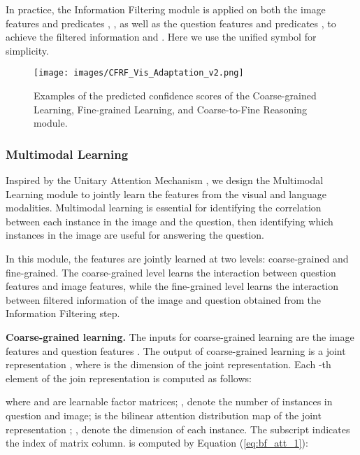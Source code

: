 \documentclass[10pt,twocolumn,letterpaper]{article}
\begin{document}
In practice, the Information Filtering module is applied on both the image features and predicates ,  , as well as the question features and predicates ,   to achieve the filtered information  and . Here we use the unified symbol  for simplicity.



\begin{figure*}[!ht]
    \centering
    \texttt{[image: images/CFRF\_Vis\_Adaptation\_v2.png]}
    \caption{Examples of the predicted confidence scores of the
    Coarse-grained Learning, Fine-grained Learning, and Coarse-to-Fine Reasoning module.}
    \label{fig:sample_Adaptation}
\end{figure*}
\subsubsection{Multimodal Learning}
\label{subsec_multi_integration}

Inspired by the Unitary Attention Mechanism \cite{Kim2018BilinearAN}, we design the Multimodal Learning module to jointly learn the features from the visual and language modalities. Multimodal learning is essential for identifying the correlation between each instance in the image and the question, then identifying which instances in the image are useful for answering the question.







In this module, the features are jointly learned at two levels: coarse-grained and fine-grained. The coarse-grained level learns the interaction between question features and image features, while the fine-grained level learns the interaction between filtered information of the image and question obtained from the Information Filtering step.





\textbf{Coarse-grained learning.} The inputs for coarse-grained learning are the image features  and question features . The output of coarse-grained learning is a joint representation , where  is the dimension of the joint representation. Each -th element  of the join representation  is computed as follows:


where  and  are learnable factor matrices; ,  denote the number of instances in question and image;   is the bilinear attention distribution map of the joint representation ; ,  denote the dimension of each instance. The subscript  indicates the index of matrix column.  is computed by Equation (\ref{eq:bf_att_1}):
\end{document}
